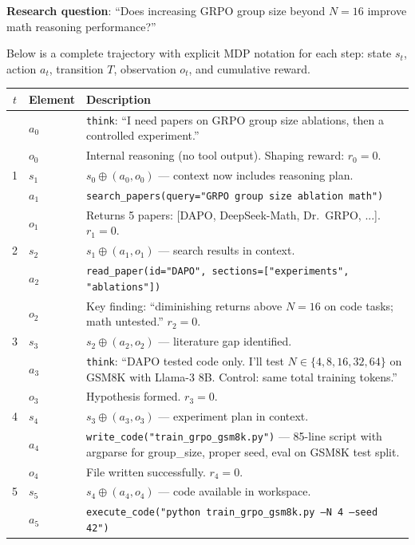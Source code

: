 \begin{examplebox}
\textbf{Research question}: ``Does increasing GRPO group size beyond $N=16$ improve math reasoning performance?''

Below is a complete trajectory with explicit MDP notation for each step: state $s_t$, action $a_t$, transition $T$, observation $o_t$, and cumulative reward.

{\footnotesize
\begin{tabular}{@{}cp{2.2cm}p{10.5cm}@{}}
\toprule
$t$ & \textbf{Element} & \textbf{Description} \\
\midrule
 & $a_0$ & \texttt{think}: ``I need papers on GRPO group size ablations, then a controlled experiment.'' \\
 & $o_0$ & Internal reasoning (no tool output). Shaping reward: $r_0 = 0$. \\
1 & $s_1$ & $s_0 \oplus (a_0, o_0)$ --- context now includes reasoning plan. \\
 & $a_1$ & \texttt{search\_papers(query="GRPO group size ablation math")} \\
 & $o_1$ & Returns 5 papers: [DAPO, DeepSeek-Math, Dr.~GRPO, ...]. $r_1 = 0$. \\
2 & $s_2$ & $s_1 \oplus (a_1, o_1)$ --- search results in context. \\
 & $a_2$ & \texttt{read\_paper(id="DAPO", sections=["experiments", "ablations"])} \\
 & $o_2$ & Key finding: ``diminishing returns above $N=16$ on code tasks; math untested.'' $r_2 = 0$. \\
3 & $s_3$ & $s_2 \oplus (a_2, o_2)$ --- literature gap identified. \\
 & $a_3$ & \texttt{think}: ``DAPO tested code only. I’ll test $N \in \{4, 8, 16, 32, 64\}$ on GSM8K with Llama-3 8B. Control: same total training tokens.'' \\
 & $o_3$ & Hypothesis formed. $r_3 = 0$. \\
4 & $s_4$ & $s_3 \oplus (a_3, o_3)$ --- experiment plan in context. \\
 & $a_4$ & \texttt{write\_code("train\_grpo\_gsm8k.py")} --- 85-line script with argparse for group\_size, proper seed, eval on GSM8K test split. \\
 & $o_4$ & File written successfully. $r_4 = 0$. \\
5 & $s_5$ & $s_4 \oplus (a_4, o_4)$ --- code available in workspace. \\
 & $a_5$ & \texttt{execute\_code("python train\_grpo\_gsm8k.py --N 4 --seed 42")} \\

\end{tabular}}
\end{examplebox}
